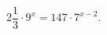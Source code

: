 \begin{ex}[type=equation]
	\begin{condition}
		$2\dfrac{1}{3}\cdot9^x = 147\cdot7^{x - 2}.$
	\end{condition}
\end{ex}